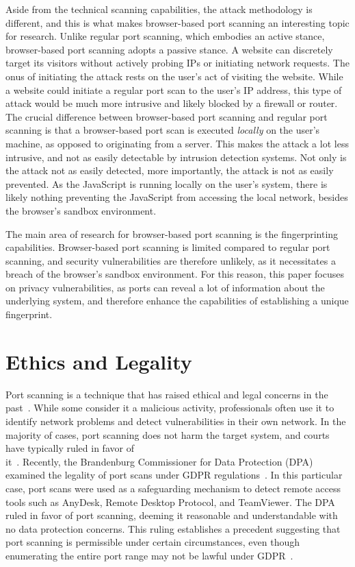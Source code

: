 Aside from the technical scanning capabilities, the attack methodology is different, and this is what makes browser-based port scanning an interesting topic for research. 
Unlike regular port scanning, which embodies an active stance, browser-based port scanning adopts a passive stance. 
A website can discretely target its visitors without actively probing IPs or initiating network requests. The onus of initiating the attack rests on the user's act of visiting the website. 
While a website could initiate a regular port scan to the user's IP address, this type of attack would be much more intrusive and likely blocked by a firewall or router.
The crucial difference between browser-based port scanning and regular port scanning is that a browser-based port scan is executed \emph{locally} on the user's machine, as opposed to originating from a server. 
This makes the attack a lot less intrusive, and not as easily detectable by intrusion detection systems. 
Not only is the attack not as easily detected, more importantly, the attack is not as easily prevented.
As the JavaScript is running locally on the user's system, there is likely nothing preventing the JavaScript from accessing the local network, besides the browser's sandbox environment.

The main area of research for browser-based port scanning is the fingerprinting capabilities. 
Browser-based port scanning is limited compared to regular port scanning, and security vulnerabilities are therefore unlikely, as it necessitates a breach of the browser's sandbox environment. 
For this reason, this paper focuses on privacy vulnerabilities, as ports can reveal a lot of information about the underlying system, and therefore enhance the capabilities of establishing a unique fingerprint.


\section{Ethics and Legality}
Port scanning is a technique that has raised ethical and legal concerns in the past~. While some consider it a malicious activity, professionals often use it to identify network problems and detect vulnerabilities in their own network. In the majority of cases, port scanning does not harm the target system, and courts have typically ruled in favor of \\ it~.
Recently, the Brandenburg Commissioner for Data Protection (DPA) examined the legality of port scans under GDPR regulations~. In this particular case, port scans were used as a safeguarding mechanism to detect remote access tools such as AnyDesk, Remote Desktop Protocol, and TeamViewer. The DPA ruled in favor of port scanning, deeming it reasonable and understandable with no data protection concerns. This ruling establishes a precedent suggesting that port scanning is permissible under certain circumstances, even though enumerating the entire port range may not be lawful under GDPR~.

